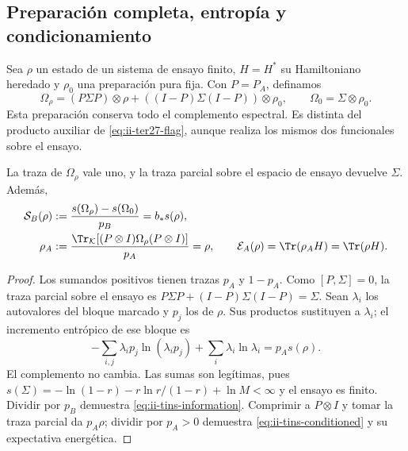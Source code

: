 \subsection{Preparación completa, entropía y condicionamiento}
\label{subsec:ii-tins-condicionamiento}

Sea $\rho$ un estado de un sistema de ensayo finito, $H=H^*$ su Hamiltoniano
heredado y $\rho_0$ una preparación pura fija. Con $P=P_A$, definamos
\begin{equation}
 \Omega_\rho=(P\Sigma P)\otimes\rho
 +((I-P)\Sigma(I-P))\otimes\rho_0,
 \qquad \Omega_0=\Sigma\otimes\rho_0.
 \label{eq:ii-tins-preparation}
\end{equation}
Esta preparación conserva todo el complemento espectral. Es distinta del
producto auxiliar de \eqref{eq:ii-ter27-flag}, aunque realiza los mismos dos
funcionales sobre el ensayo.

\begin{theorem}
\label{thm:ii-tins-readings}
La traza de $\Omega_\rho$ vale uno, y la traza parcial sobre el espacio
de ensayo devuelve $\Sigma$. Además,
\begin{align}
 \mathcal S_B(\rho)&:=
 \frac{s(\Omega_\rho)-s(\Omega_0)}{p_B}=b_*s(\rho),
 \label{eq:ii-tins-information}\\
 \rho_A&:=\frac{\Tr_{\mathcal K}[(P\otimes I)\Omega_\rho(P\otimes I)]}{p_A}
 =\rho,\qquad
 \mathcal E_A(\rho)=\Tr(\rho_AH)=\Tr(\rho H).
 \label{eq:ii-tins-conditioned}
\end{align}
\end{theorem}
\begin{proof}
Los sumandos positivos tienen trazas $p_A$ y $1-p_A$. Como $[P,\Sigma]=0$,
la traza parcial sobre el ensayo es
$P\Sigma P+(I-P)\Sigma(I-P)=\Sigma$. Sean $\lambda_i$ los autovalores
del bloque marcado y $p_j$ los de $\rho$. Sus productos sustituyen a
$\lambda_i$; el incremento entrópico de ese bloque es
\[
 -\sum_{i,j}\lambda_ip_j\ln(\lambda_ip_j)
 +\sum_i\lambda_i\ln\lambda_i=p_As(\rho).
\]
El complemento no cambia. Las sumas son legítimas, pues
$s(\Sigma)=-\ln(1-r)-r\ln r/(1-r)+\ln M<\infty$ y el ensayo es finito.
Dividir por $p_B$ demuestra \eqref{eq:ii-tins-information}. Comprimir a
$P\otimes I$ y tomar la traza parcial da $p_A\rho$; dividir por $p_A>0$
demuestra \eqref{eq:ii-tins-conditioned} y su expectativa energética.
\end{proof}

